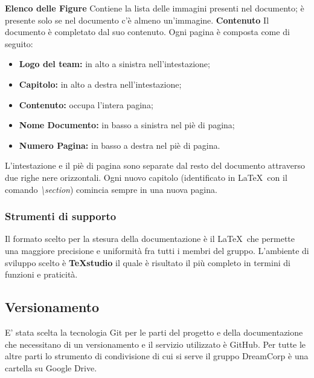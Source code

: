 		\newline \newline \textbf{Elenco delle Figure} Contiene la lista delle immagini presenti nel documento; è presente solo se nel documento c'è almeno un'immagine.
		\newline \newline \textbf{Contenuto}  Il documento è completato dal suo contenuto. Ogni pagina è composta come di seguito:\newline
		\begin{itemize}
			\item \textbf{Logo del team:} in alto a sinistra nell'intestazione;
			\item \textbf{Capitolo:} in alto a destra nell'intestazione;
			\item \textbf{Contenuto:} occupa l'intera pagina;
			\item \textbf{Nome Documento:} in basso a sinistra nel piè di pagina;
			\item \textbf{Numero Pagina:} in basso a destra nel piè di pagina. \newline
		\end{itemize}
		L'intestazione e il piè di pagina sono separate dal resto del documento attraverso due righe nere orizzontali. Ogni nuovo capitolo (identificato in \LaTeX ~con il comando \textit{\textbackslash{}section}) comincia sempre in una nuova pagina.
		\subsubsection{Strumenti di supporto}
		\label{3.1.8}
			Il formato scelto per la stesura della documentazione è il  \LaTeX ~che permette una maggiore precisione e uniformità fra tutti i membri del gruppo. L'ambiente di sviluppo scelto è \textbf{TeXstudio\pedice} il quale è risultato il più completo in termini di funzioni e praticità.
	\subsection{Versionamento}
		E' stata scelta la tecnologia Git per le parti del progetto e della documentazione che necessitano di un versionamento e il servizio utilizzato è GitHub. Per tutte le altre parti lo strumento di condivisione di cui si serve il gruppo DreamCorp è una cartella su Google Drive\pedice.
